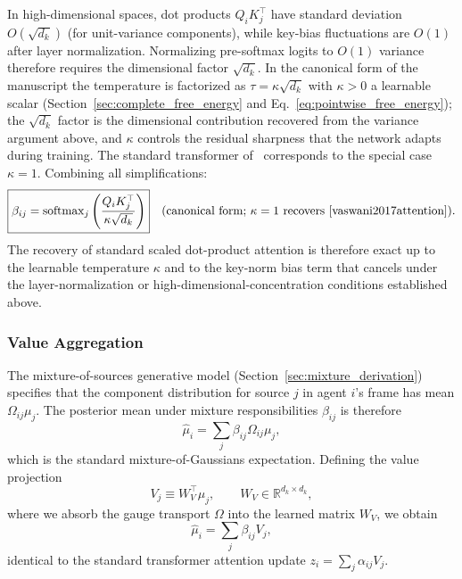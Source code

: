 \documentclass[11pt]{article}
\begin{document}
In high-dimensional spaces, dot products $Q_iK_j^\top$ have standard deviation $O(\sqrt{d_k})$ (for unit-variance components), while key-bias fluctuations are $O(1)$ after layer normalization. Normalizing pre-softmax logits to $O(1)$ variance therefore requires the dimensional factor $\sqrt{d_k}$. In the canonical form of the manuscript the temperature is factorized as $\tau = \kappa\sqrt{d_k}$ with $\kappa > 0$ a learnable scalar (Section~\ref{sec:complete_free_energy} and Eq.~\eqref{eq:pointwise_free_energy}); the $\sqrt{d_k}$ factor is the dimensional contribution recovered from the variance argument above, and $\kappa$ controls the residual sharpness that the network adapts during training. The standard transformer of~\cite{vaswani2017attention} corresponds to the special case $\kappa = 1$. Combining all simplifications:
\begin{equation}
\boxed{\beta_{ij} = \mathrm{softmax}_j\left(\frac{Q_i K_j^\top}{\kappa\sqrt{d_k}}\right)}\quad\text{(canonical form; }\kappa=1\text{ recovers~\cite{vaswani2017attention}).}
\end{equation}
The recovery of standard scaled dot-product attention is therefore exact up to the learnable temperature $\kappa$ and to the key-norm bias term that cancels under the layer-normalization or high-dimensional-concentration conditions established above.

\subsubsection{Value Aggregation}\label{sec:value_aggregation_itfb}

The mixture-of-sources generative model (Section~\ref{sec:mixture_derivation}) specifies that the component distribution for source $j$ in agent $i$'s frame has mean $\Omega_{ij}\mu_j$. The posterior mean under mixture responsibilities $\beta_{ij}$ is therefore
\begin{equation}
\hat\mu_i = \sum_j \beta_{ij} \Omega_{ij}\mu_j,
\label{eq:glk_mixture_aggregation_itfb}
\end{equation}
which is the standard mixture-of-Gaussians expectation. Defining the value projection
\begin{equation}
V_j \equiv W_V^{\top}\mu_j, \qquad W_V \in \mathbb{R}^{d_k \times d_k},
\end{equation}
where we absorb the gauge transport $\Omega$ into the learned matrix $W_V$, we obtain
\begin{equation}
\boxed{\hat\mu_i = \sum_j \beta_{ij} V_j},
\end{equation}
identical to the standard transformer attention update $z_i = \sum_j \alpha_{ij} V_j$.
\end{document}
